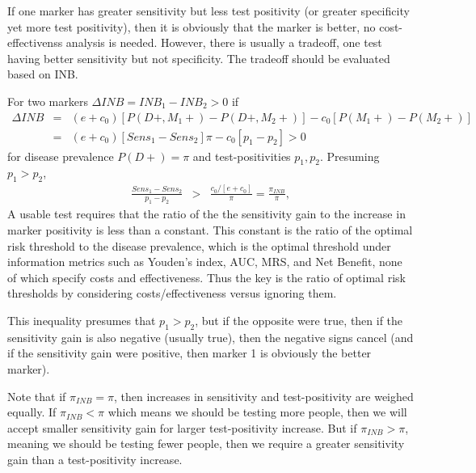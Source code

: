 \documentclass[11pt]{article}
\begin{document}
If one marker has greater sensitivity but less test positivity (or greater specificity yet more test positivity), then it is obviously that the marker is better, no cost-effectivenss analysis is needed.  However, there is usually a tradeoff, one test having better sensitivity but not specificity.  The tradeoff should be evaluated based on INB.

For two markers $\Delta INB=INB_1-INB_2>0$ if
\begin{eqnarray*}
\Delta INB &=& (e+c_0)[P(D+,M_1+)-P(D+,M_2+)] - c_0[P(M_1+)-P(M_2+)]\\
           &=& (e+c_0)[Sens_1-Sens_2]\pi - c_0[p_1-p_2] > 0
\end{eqnarray*}
for disease prevalence $P(D+)=\pi$ and test-positivities $p_1,p_2$.  Presuming $p_1>p_2$,
\begin{eqnarray}
\frac{Sens_1-Sens_2}{p_1-p_2} &>& \frac{c_0/[e+c_0]}{\pi} = \frac{\pi_{INB}}{\pi},
\end{eqnarray}
A usable test requires that the ratio of the the sensitivity gain to the increase in marker positivity is less than a constant.  This constant is the ratio of the optimal risk threshold to the disease prevalence, which is the optimal threshold under information metrics such as Youden's index, AUC, MRS, and Net Benefit, none of which specify costs and effectiveness.  Thus the key is the ratio of optimal risk thresholds by considering costs/effectiveness versus ignoring them.

This inequality presumes that $p_1>p_2$, but if the opposite were true, then if the sensitivity gain is also negative (usually true), then the negative signs cancel (and if the sensitivity gain were positive, then marker 1 is obviously the better marker).  

Note that if $\pi_{INB}=\pi$, then increases in sensitivity and test-positivity are weighed equally.  If $\pi_{INB}<\pi$ which means we should be testing more people, then we will accept smaller sensitivity gain for larger test-positivity increase.  But if $\pi_{INB}>\pi$, meaning we should be testing fewer people, then we require a greater sensitivity gain than a test-positivity increase.  
\end{document}
